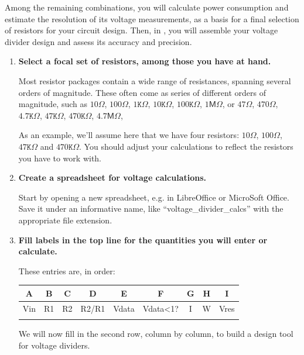 Among the remaining combinations, you will calculate power consumption and estimate the resolution %
of its voltage measurements, as a basis for a final selection of resistors for your circuit design.
Then, in , you will assemble your voltage divider design and assess its accuracy and precision.
\begin{enumerate}
	\item \textbf{Select a focal set of resistors, among those you have at hand.}

	Most resistor packages contain a wide range of resistances, spanning several orders of magnitude.
	These often come as series of different orders of magnitude, such as $10 \Omega$, $100 \Omega$, $1\mathtt{K} \Omega$, $10\mathtt{K} \Omega$, $100\mathtt{K} \Omega$, $1 \mathsf{M} \Omega$, or $47 \Omega$, $470 \Omega$, $4.7\mathtt{K} \Omega$, $47\mathtt{K} \Omega$, $470\mathtt{K} \Omega$, $4.7 \mathsf{M} \Omega$, \etc

	\smallskip
	As an example, we'll assume here that we have four resistors: $10 \Omega$, $100 \Omega$, $47\mathtt{K} \Omega$ and $470\mathtt{K} \Omega$.
	You should adjust your calculations to reflect the resistors you have to work with.

	\item \textbf{Create a spreadsheet for voltage calculations.}

	Start by opening a new spreadsheet, e.g. in LibreOffice or MicroSoft Office.
	Save it under an informative name, like ``voltage\_divider\_calcs'' with the appropriate file extension.

	\item \textbf{Fill labels in the top line for the quantities you will enter or calculate.}

	These entries are, in order:
	\begin{table}[H]
	\centering
	\begin{small}
	\begin{tabular}{|c|c|c|c|c|c|c|c|c|}
		\hline
		\textbf{A}  & \textbf{B} & \textbf{C} & \textbf{D} & \textbf{E} & \textbf{F} & \textbf{G} & \textbf{H} & \textbf{I} \\
		\hline
		Vin  & R1 & R2 & R2/R1 & Vdata & Vdata<1? & I & W & Vres \\
		\hline
		&  &  &  &  &  &  &  &  \\
		\hline
	\end{tabular}
	\end{small}
	\end{table}
	We will now fill in the second row, column by column, to build a design tool for voltage dividers.


\end{enumerate}
